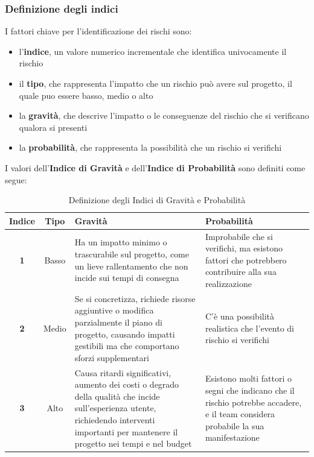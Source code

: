 \documentclass{article}
\begin{document}
        \subsubsection{Definizione degli indici}
        I fattori chiave per l’identificazione dei rischi sono:
        \begin{itemize}
            \item l’\textbf{indice}, un valore numerico incrementale che identifica univocamente il rischio
            \item il \textbf{tipo}, che rappresenta l’impatto che un rischio può avere sul progetto, il quale puo essere basso, medio o alto
            \item la \textbf{gravità}, che descrive l'impatto o le conseguenze del rischio che si verificano qualora si presenti
            \item la \textbf{probabilità}, che rappresenta la possibilità che un rischio si verifichi
        \end{itemize}
        I valori dell'\textbf{Indice di Gravità} e dell'\textbf{Indice di Probabilità} sono definiti come segue:
        \begin{table}[h!]
            \centering
            \begin{tabular}{|c|c|p{6cm}|p{6cm}|}
                \hline
                \textbf{Indice} & \textbf{Tipo} & \textbf{Gravità} & \textbf{Probabilità} \\
                \hline
                \textbf{1} & Basso & Ha un impatto minimo o trascurabile sul progetto, come un lieve rallentamento che non incide sui tempi di consegna & Improbabile che si verifichi, ma esistono fattori che potrebbero contribuire alla sua realizzazione \\
                \hline
                \textbf{2} & Medio & Se si concretizza, richiede risorse aggiuntive o modifica parzialmente il piano di progetto, causando impatti gestibili ma che comportano sforzi supplementari & C'è una possibilità realistica che l'evento di rischio si verifichi \\
                \hline
                \textbf{3} & Alto & Causa ritardi significativi, aumento dei costi o degrado della qualità che incide sull'esperienza utente, richiedendo interventi importanti per mantenere il progetto nei tempi e nel budget & Esistono molti fattori o segni che indicano che il rischio potrebbe accadere, e il team considera probabile la sua manifestazione \\
                \hline
            \end{tabular}
            \caption{Definizione degli Indici di Gravità e Probabilità}
            \label{tab:definizione_indici}
        \end{table}
\end{document}
